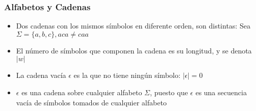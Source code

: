 \begin{frame}
  \frametitle{Alfabetos y Cadenas}
\begin{itemize}[<+->]
\item Dos cadenas con los mismos símbolos en diferente orden, son distintas: 
Sea $\Sigma = \{a, b, c\}, aca \neq caa$

\item El número de símbolos que componen la cadena es su longitud, y se denota $|w|$

\item La cadena vacía $\epsilon$ es la que no tiene ningún símbolo: $|\epsilon| = 0$

\item $\epsilon$ es una cadena sobre cualquier alfabeto $\Sigma$, puesto que $\epsilon$ es
una secuencia vacía de símbolos tomados de cualquier alfabeto
\end{itemize}
\end{frame}
